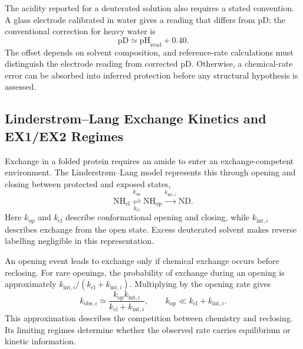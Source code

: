 The acidity reported for a deuterated solution also requires a stated convention. A glass electrode calibrated in water gives a reading that differs from pD; the conventional correction for heavy water is
\begin{equation}
    \mathrm{pD}\simeq\mathrm{pH}_{\text{read}}+0.40.
    \label{eq:bg-pd}
\end{equation}
The offset depends on solvent composition, and reference-rate calculations must distinguish the electrode reading from corrected pD.\supercite{glasoeUseGlassElectrodes1960,nguyenReferenceParametersProtein2018} Otherwise, a chemical-rate error can be absorbed into inferred protection before any structural hypothesis is assessed.

\subsection{Linderstr{\o}m--Lang Exchange Kinetics and EX1/EX2 Regimes}
\label{sec:bg-exchange-regimes}

Exchange in a folded protein requires an amide to enter an exchange-competent environment. The Linderstr{\o}m--Lang model represents this through opening and closing between protected and exposed states,
\begin{equation}
    \mathrm{NH}_{\text{cl}}
    \underset{k_{\text{cl}}}{\overset{k_{\text{op}}}{\rightleftharpoons}}
    \mathrm{NH}_{\text{op}}
    \xrightarrow{k_{\text{int},i}}\mathrm{ND}.
    \label{eq:bg-ll-scheme}
\end{equation}
Here $k_{\text{op}}$ and $k_{\text{cl}}$ describe conformational opening and closing, while $k_{\text{int},i}$ describes exchange from the open state. Excess deuterated solvent makes reverse labelling negligible in this representation.\supercite{skinnerProteinHydrogenExchange2012,englanderHydrogenExchangeModern1997}

An opening event leads to exchange only if chemical exchange occurs before reclosing. For rare openings, the probability of exchange during an opening is approximately $k_{\text{int},i}/(k_{\text{cl}}+k_{\text{int},i})$. Multiplying by the opening rate gives
\begin{equation}
    k_{\text{obs},i}\simeq
    \frac{k_{\text{op}}k_{\text{int},i}}
    {k_{\text{cl}}+k_{\text{int},i}},
    \qquad k_{\text{op}}\ll k_{\text{cl}}+k_{\text{int},i}.
    \label{eq:bg-effective-rate}
\end{equation}
This approximation describes the competition between chemistry and reclosing. Its limiting regimes determine whether the observed rate carries equilibrium or kinetic information.\supercite{skinnerProteinHydrogenExchange2012}

